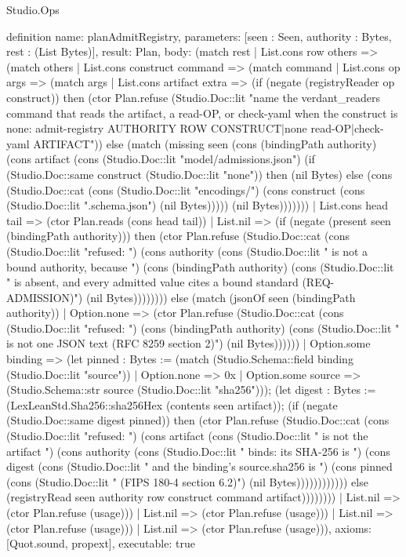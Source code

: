 \begin{lexlean}{Studio.Ops}
\begin{semanticmodule}
{definition{
  name: planAdmitRegistry,
  parameters: [seen : Seen, authority : Bytes, rest : (List Bytes)],
  result: Plan,
  body: (match rest
    | List.cons row others => (match others
      | List.cons construct command => (match command
        | List.cons op args => (match args
          | List.cons artifact extra => (if (negate (registryReader op construct)) then (ctor Plan.refuse (Studio.Doc::lit "name the verdant_readers command that reads the artifact, a read-OP, or check-yaml when the construct is none: admit-registry AUTHORITY ROW CONSTRUCT|none read-OP|check-yaml ARTIFACT\n")) else (match (missing seen (cons (bindingPath authority) (cons artifact (cons (Studio.Doc::lit "model/admissions.json") (if (Studio.Doc::same construct (Studio.Doc::lit "none")) then (nil Bytes) else (cons (Studio.Doc::cat (cons (Studio.Doc::lit "encodings/") (cons construct (cons (Studio.Doc::lit ".schema.json") (nil Bytes))))) (nil Bytes)))))))
            | List.cons head tail => (ctor Plan.reads (cons head tail))
            | List.nil => (if (negate (present seen (bindingPath authority))) then (ctor Plan.refuse (Studio.Doc::cat (cons (Studio.Doc::lit "refused: ") (cons authority (cons (Studio.Doc::lit " is not a bound authority, because ") (cons (bindingPath authority) (cons (Studio.Doc::lit " is absent, and every admitted value cites a bound standard (REQ-ADMISSION)\n") (nil Bytes)))))))) else (match (jsonOf seen (bindingPath authority))
              | Option.none => (ctor Plan.refuse (Studio.Doc::cat (cons (Studio.Doc::lit "refused: ") (cons (bindingPath authority) (cons (Studio.Doc::lit " is not one JSON text (RFC 8259 section 2)\n") (nil Bytes))))))
              | Option.some binding => (let pinned : Bytes := (match (Studio.Schema::field binding (Studio.Doc::lit "source"))
                | Option.none => 0x
                | Option.some source => (Studio.Schema::str source (Studio.Doc::lit "sha256"))); (let digest : Bytes := (LexLeanStd.Sha256::sha256Hex (contents seen artifact)); (if (negate (Studio.Doc::same digest pinned)) then (ctor Plan.refuse (Studio.Doc::cat (cons (Studio.Doc::lit "refused: ") (cons artifact (cons (Studio.Doc::lit " is not the artifact ") (cons authority (cons (Studio.Doc::lit " binds: its SHA-256 is ") (cons digest (cons (Studio.Doc::lit " and the binding's source.sha256 is ") (cons pinned (cons (Studio.Doc::lit " (FIPS 180-4 section 6.2)\n") (nil Bytes)))))))))))) else (registryRead seen authority row construct command artifact))))))))
          | List.nil => (ctor Plan.refuse (usage)))
        | List.nil => (ctor Plan.refuse (usage)))
      | List.nil => (ctor Plan.refuse (usage)))
    | List.nil => (ctor Plan.refuse (usage))),
  axioms: [Quot.sound, propext],
  executable: true
}



}
\end{semanticmodule}
\end{lexlean}
